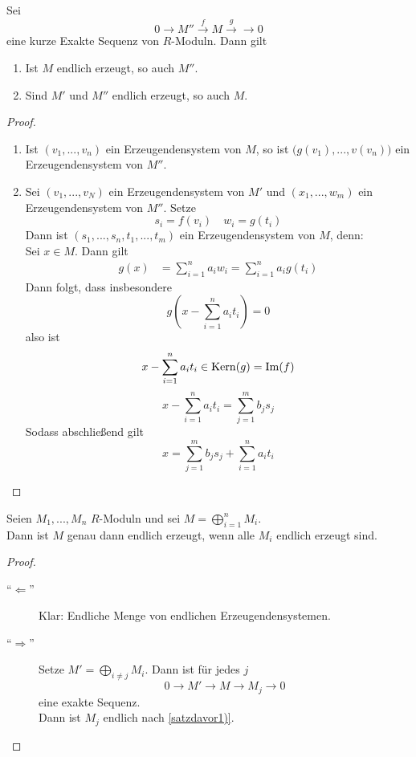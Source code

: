 	\begin{satz}
		Sei
		\[0\to M''\xrightarrow{f}M\xrightarrow{g}\to0\]
		eine kurze Exakte Sequenz von $R$-Moduln. Dann gilt
		\begin{enumerate}
			\item Ist $M$ endlich erzeugt, so auch $M''$.
			\item Sind $M'$ und $M''$ endlich erzeugt, so auch $M$.
		\end{enumerate}
	\end{satz}
	\begin{proof}
		\begin{enumerate}
			\item Ist $(v_1,...,v_n)$ ein Erzeugendensystem von $M$, so ist $\big(g(v_1),...,v(v_n)\big)$ ein Erzeugendensystem von $M''$.
			\item Sei $(v_1,...,v_N)$ ein Erzeugendensystem von $M'$ und $(x_1,...,w_m)$ ein Erzeugendensystem von $M''$. Setze
			\[s_i=f(v_i)\quad w_i=g(t_i)\]
			Dann ist $(s_1,...,s_n,t_1,...,t_m)$ ein Erzeugendensystem von $M$, denn:\\
			Sei $x\in M$. Dann gilt
			\begin{align*}
			g(x)&=\sum_{i=1}^{n}a_iw_i=\sum_{i=1}^{n}a_ig(t_i)
			\end{align*}
			Dann folgt, dass insbesondere
			\[g\left(x-\sum_{i=1}^{n}a_it_i\right)=0\]
			also ist
			\[x-\sum_{i=1}^{n}a_it_i\in\operatorname{Kern}(g)=\operatorname{Im}(f)\]
			\[x-\sum_{i=1}^{n}a_it_i=\sum_{j=1}^{m}b_js_j\]
			Sodass abschließend gilt
			\[x=\sum_{j=1}^{m}b_js_j+\sum_{i=1}^{n}a_it_i\]
		\end{enumerate}
	\end{proof}

	\begin{satz}
		Seien $M_1,...,M_n$ $R$-Moduln und sei $M=\bigoplus_{i=1}^nM_i$. \\
		Dann ist $M$ genau dann endlich erzeugt, wenn alle $M_i$ endlich erzeugt sind.
	\end{satz}
	\begin{proof}
		\begin{description}
			\item[\enquote{$\Leftarrow$}] Klar: Endliche Menge von endlichen Erzeugendensystemen.
			\item[\enquote{$\Rightarrow$}] Setze $M'=\bigoplus_{i\neq j}M_i$. Dann ist für jedes $j$
			\[0\to M'\xrightarrow{ }M\xrightarrow{ }M_j\to0 \]
			eine exakte Sequenz.\\
			Dann ist $M_j$ endlich nach \ref{satzdavor1)}.
		\end{description}
	\end{proof}

